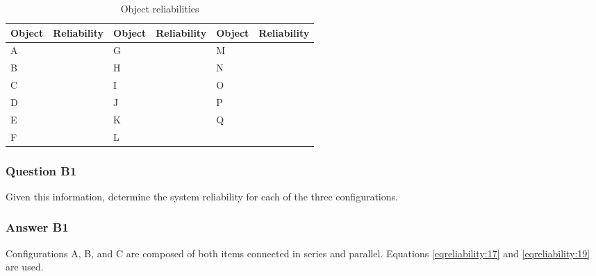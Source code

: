 \begin{table}[h]
\caption{Object reliabilities}
\vspace{3pt} \noindent
\begin{tabular}{|p{28pt}|p{63pt}|p{28pt}|p{59pt}|p{34pt}|p{55pt}|}
\hline
\parbox{28pt}{\centering 
Object
} & \parbox{63pt}{\centering 
Reliability
} & \parbox{28pt}{\centering 
Object
} & \parbox{59pt}{\centering 
Reliability
} & \parbox{34pt}{\centering 
Object
} & \parbox{55pt}{\centering 
Reliability
} \\
\hline
\parbox{28pt}{\centering 
A
} & \parbox{63pt}{
} & \parbox{28pt}{\centering 
G
} & \parbox{59pt}{
} & \parbox{34pt}{\centering 
M
} & \parbox{55pt}{
} \\
\hline
\parbox{28pt}{\centering 
B
} & \parbox{63pt}{
} & \parbox{28pt}{\centering 
H
} & \parbox{59pt}{
} & \parbox{34pt}{\centering 
N
} & \parbox{55pt}{
} \\
\hline
\parbox{28pt}{\centering 
C
} & \parbox{63pt}{
} & \parbox{28pt}{\centering 
I
} & \parbox{59pt}{
} & \parbox{34pt}{\centering 
O
} & \parbox{55pt}{
} \\
\hline
\parbox{28pt}{\centering 
D
} & \parbox{63pt}{
} & \parbox{28pt}{\centering 
J
} & \parbox{59pt}{
} & \parbox{34pt}{\centering 
P
} & \parbox{55pt}{
} \\
\hline
\parbox{28pt}{\centering 
E
} & \parbox{63pt}{
} & \parbox{28pt}{\centering 
K
} & \parbox{59pt}{
} & \parbox{34pt}{\centering 
Q
} & \parbox{55pt}{
} \\
\hline
\parbox{28pt}{\centering 
F
} & \parbox{63pt}{
} & \parbox{28pt}{\centering 
L
} & \parbox{59pt}{
} & \parbox{34pt}{\centering } & \parbox{55pt}{\centering } \\
\hline
\end{tabular}
\vspace{2pt}
\label{tbl-reliability-a:2}\end{table}
\subsubsection{Question B1}
Given this information, determine the system reliability for each of the three
configurations.
\subsubsection{Answer B1}
Configurations A, B, and C are composed of both items connected in series and
parallel. Equations \eqref{eqreliability:17} and \eqref{eqreliability:19} are used.

